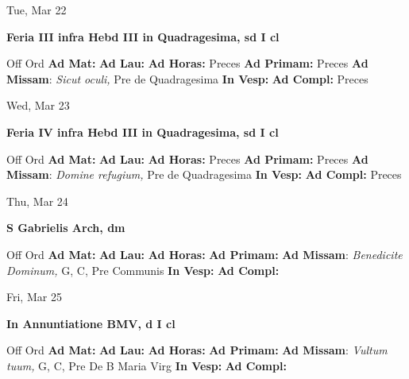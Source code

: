 \documentclass[10pt]{article}
\begin{document}
\begin{minipage}{3.5in}
\vspace{2em}\begin{center}
Tue, Mar 22
\end{center}\textbf{ \large Feria III infra Hebd III in Quadragesima, \textnormal{\normalsize sd I cl}}
\begin{justify}
Off Ord
\textbf{Ad Mat: }
\textbf{Ad Lau: }
\textbf{Ad Horas: }Preces
\textbf{Ad Primam: }Preces
\textbf{Ad Missam}: \textit{Sicut oculi,} Pre de Quadragesima
\textbf{In Vesp: }
\textbf{Ad Compl: }Preces\end{justify}
\end{minipage}



\begin{minipage}{3.5in}
\vspace{2em}\begin{center}
Wed, Mar 23
\end{center}\textbf{ \large Feria IV infra Hebd III in Quadragesima, \textnormal{\normalsize sd I cl}}
\begin{justify}
Off Ord
\textbf{Ad Mat: }
\textbf{Ad Lau: }
\textbf{Ad Horas: }Preces
\textbf{Ad Primam: }Preces
\textbf{Ad Missam}: \textit{Domine refugium,} Pre de Quadragesima
\textbf{In Vesp: }
\textbf{Ad Compl: }Preces\end{justify}
\end{minipage}



\begin{minipage}{3.5in}
\vspace{2em}\begin{center}
Thu, Mar 24
\end{center}\textbf{ \large S Gabrielis Arch, \textnormal{\normalsize dm}}
\begin{justify}
Off Ord
\textbf{Ad Mat: }
\textbf{Ad Lau: }
\textbf{Ad Horas: }
\textbf{Ad Primam: }
\textbf{Ad Missam}: \textit{Benedicite Dominum,} G, C, Pre Communis
\textbf{In Vesp: }
\textbf{Ad Compl: }\end{justify}
\end{minipage}



\begin{minipage}{3.5in}
\vspace{2em}\begin{center}
Fri, Mar 25
\end{center}\textbf{ \large In Annuntiatione BMV, \textnormal{\normalsize d I cl}}
\begin{justify}
Off Ord
\textbf{Ad Mat: }
\textbf{Ad Lau: }
\textbf{Ad Horas: }
\textbf{Ad Primam: }
\textbf{Ad Missam}: \textit{Vultum tuum,} G, C, Pre De B Maria Virg
\textbf{In Vesp: }
\textbf{Ad Compl: }\end{justify}
\end{minipage}
\end{document}

